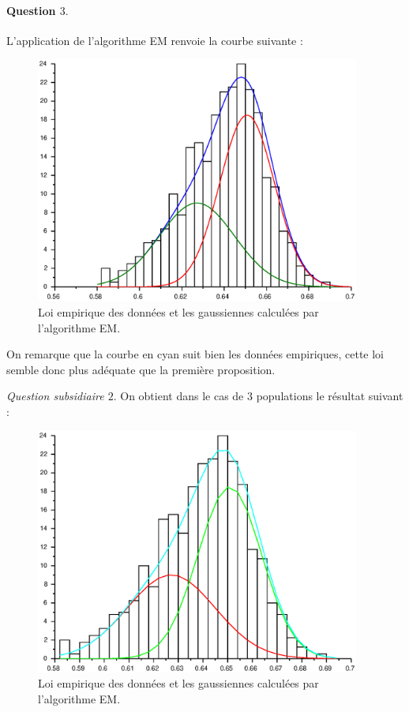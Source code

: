 \documentclass[12pt,a4paper]{article}
\begin{document}
\paragraph*{Question $3.$} L'application de l'algorithme EM renvoie la courbe suivante :

\begin{figure}[H]
	\centering
	\includegraphics[width=0.95\textwidth]{images/figure1.eps}
	\caption{Loi empirique des données et les gaussiennes calculées par l'algorithme EM.}
\end{figure}

On remarque que la courbe en cyan suit bien les données empiriques, cette loi semble donc plus adéquate que la première proposition.

\textit{Question subsidiaire $2.$} On obtient dans le cas de $3$ populations le résultat suivant :

\begin{figure}[H]
	\centering
	\includegraphics[width=0.95\textwidth]{images/figure2.eps}
	\caption{Loi empirique des données et les gaussiennes calculées par l'algorithme EM.}
\end{figure}
\end{document}

